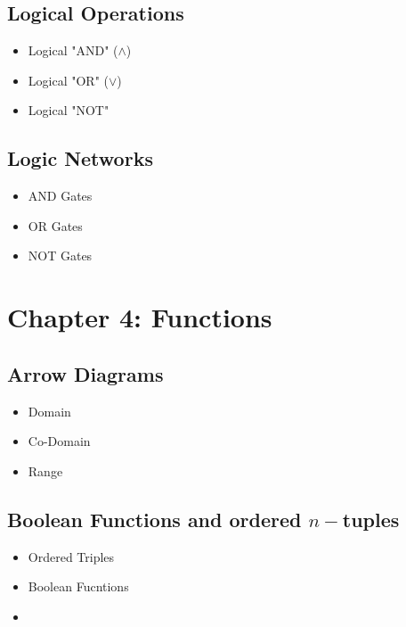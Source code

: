 


\subsection{Logical Operations}

\begin{itemize}
\item Logical "AND" ($\wedge$)
\item Logical "OR" ($\vee$)
\item Logical "NOT" 
\end{itemize}
\newpage

\subsection*{Logic Networks}
\begin{itemize}
\item AND Gates
\item OR Gates
\item NOT Gates
\end{itemize}

\newpage

\section*{Chapter 4: Functions}

\subsection{Arrow Diagrams}

\begin{itemize}
\item Domain 
\item Co-Domain 
\item Range
\end{itemize}

\newpage
\subsection{Boolean Functions and ordered $n-$tuples}


\begin{itemize}
\item Ordered Triples
\item Boolean Fucntions
\item
\end{itemize}